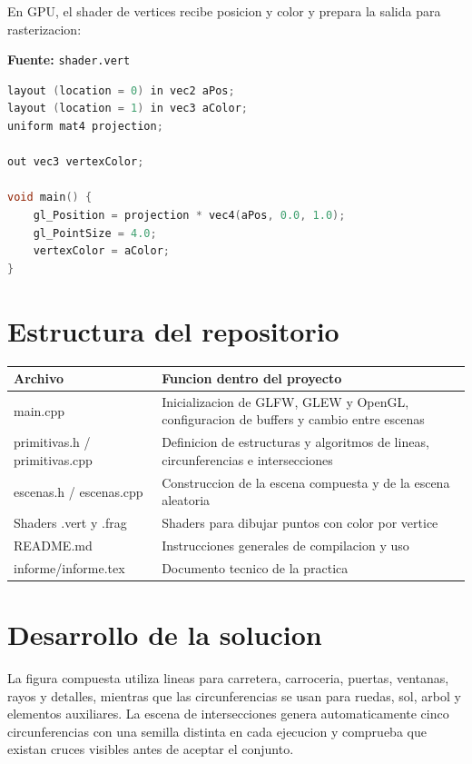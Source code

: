 \documentclass[12pt,a4paper]{article}
\begin{document}
En GPU, el shader de vertices recibe posicion y color y prepara la salida para rasterizacion:

\noindent\textbf{Fuente:} \texttt{shader.vert}

\begin{lstlisting}[language=C++]
layout (location = 0) in vec2 aPos;
layout (location = 1) in vec3 aColor;
uniform mat4 projection;

out vec3 vertexColor;

void main() {
	gl_Position = projection * vec4(aPos, 0.0, 1.0);
	gl_PointSize = 4.0;
	vertexColor = aColor;
}
\end{lstlisting}

\section{Estructura del repositorio}

\begin{center}
\begin{tabular}{p{4.2cm}p{9.2cm}}
\toprule
Archivo & Funcion dentro del proyecto \\
\midrule
main.cpp & Inicializacion de GLFW, GLEW y OpenGL, configuracion de buffers y cambio entre escenas \\
primitivas.h / primitivas.cpp & Definicion de estructuras y algoritmos de lineas, circunferencias e intersecciones \\
escenas.h / escenas.cpp & Construccion de la escena compuesta y de la escena aleatoria \\
Shaders .vert y .frag & Shaders para dibujar puntos con color por vertice \\
README.md & Instrucciones generales de compilacion y uso \\
informe/informe.tex & Documento tecnico de la practica \\
\bottomrule
\end{tabular}
\end{center}

\section{Desarrollo de la solucion}

La figura compuesta utiliza lineas para carretera, carroceria, puertas, ventanas, rayos y detalles, mientras que las circunferencias se usan para ruedas, sol, arbol y elementos auxiliares. La escena de intersecciones genera automaticamente cinco circunferencias con una semilla distinta en cada ejecucion y comprueba que existan cruces visibles antes de aceptar el conjunto.
\end{document}
